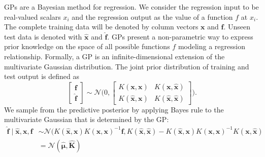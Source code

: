 \ac{GP}s are a Bayesian method for regression. We consider the regression input to be real-valued scalars $x_i$ and the regression output as the value of a function $f$ at $x_i$. The complete training data will be denoted by column vectors $\mathbf{x}$ and $\mathbf{f}$. Unseen test data is denoted with $\mathbf{\hat{x}}$ and $\mathbf{\hat{f}}$.
\ac{GP}s present a non-parametric way to express prior knowledge on the space of all possible functions $f$ modeling
a regression relationship.
Formally, a GP is an infinite-dimensional extension of the multivariate Gaussian distribution.
The joint prior distribution of training and test output is defined as 
\begin{equation}
\begin{bmatrix}
\mathbf{f} \\ 
\mathbf{\hat{f}}
\end{bmatrix}
\sim \mathcal{N}\bigg(
0,
\begin{bmatrix}
K(\mathbf{x},\mathbf{x})& K(\mathbf{x},\mathbf{\hat{x}})\\ 
K(\mathbf{\hat{x}},\mathbf{x})& K(\mathbf{\hat{x}},\mathbf{\hat{x}})
\end{bmatrix}
\bigg).
\end{equation}
We sample from the predictive posterior by applying Bayes rule to the multivariate Gaussian that is determined by the \ac{GP}:
\begin{align}
\mathbf{\hat{f}} \mid \mathbf{\hat{x}},\mathbf{x},\mathbf{f} &
\sim \mathcal{N}(
K(\mathbf{\hat{x}},\mathbf{x}) K(\mathbf{x},\mathbf{x})^{-1}\mathbf{f},
K(\mathbf{\hat{x}},\mathbf{\hat{x}}) -K(\mathbf{\hat{x}},\mathbf{x}) K(\mathbf{x},\mathbf{x})^{-1}K(\mathbf{x},\mathbf{\hat{x}})\\
& = \mathcal{N}(\bm{\hat{\mu}},\mathbf{\hat{K}})
\end{align}

